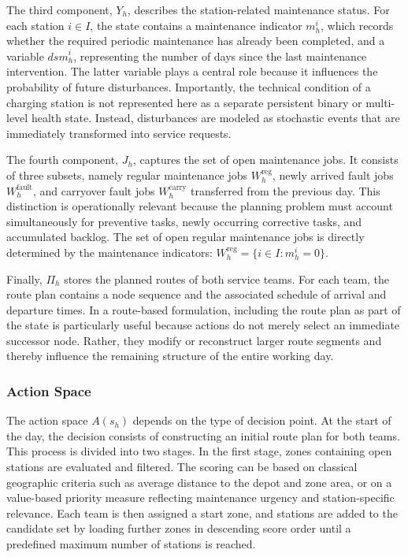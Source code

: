 \documentclass[12pt,oneside]{article}
\begin{document}
The third component, $Y_h$, describes the station-related maintenance status. For each station $i \in I$, the state contains a maintenance indicator $m_h^i$, which records whether the required periodic maintenance has already been completed, and a variable $\mathit{dsm}_h^i$, representing the number of days since the last maintenance intervention. The latter variable plays a central role because it influences the probability of future disturbances. Importantly, the technical condition of a charging station is not represented here as a separate persistent binary or multi-level health state. Instead, disturbances are modeled as stochastic events that are immediately transformed into service requests.

The fourth component, $J_h$, captures the set of open maintenance jobs. It consists of three subsets, namely regular maintenance jobs $W_h^{\mathrm{reg}}$, newly arrived fault jobs $W_h^{\mathrm{fault}}$, and carryover fault jobs $W_h^{\mathrm{carry}}$ transferred from the previous day. This distinction is operationally relevant because the planning problem must account simultaneously for preventive tasks, newly occurring corrective tasks, and accumulated backlog. The set of open regular maintenance jobs is directly determined by the maintenance indicators: $W_h^{\mathrm{reg}} = \{i \in I : m_h^i = 0\}$.

Finally, $\Pi_h$ stores the planned routes of both service teams. For each team, the route plan contains a node sequence and the associated schedule of arrival and departure times. In a route-based formulation, including the route plan as part of the state is particularly useful because actions do not merely select an immediate successor node. Rather, they modify or reconstruct larger route segments and thereby influence the remaining structure of the entire working day.
\subsubsection{Action Space}
The action space $A(s_h)$ depends on the type of decision point. At the start of the day, the decision consists of constructing an initial route plan for both teams. This process is divided into two stages. In the first stage, zones containing open stations are evaluated and filtered. The scoring can be based on classical geographic criteria such as average distance to the depot and zone area, or on a value-based priority measure reflecting maintenance urgency and station-specific relevance. Each team is then assigned a start zone, and stations are added to the candidate set by loading further zones in descending score order until a predefined maximum number of stations is reached.
\end{document}
